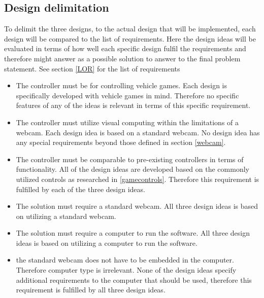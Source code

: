 \subsection{Design delimitation}

To delimit the three designs, to the actual design that will be implemented, each design will be compared to the list of requirements. Here the design ideas will be evaluated in terms of how well each specific design fulfil the requirements and therefore might answer as a possible solution to answer to the final problem statement. See section \ref{LOR} for the list of requirements

\begin{itemize}
\item The controller must be for controlling vehicle games.\newline
Each design is specifically developed with vehicle games in mind. Therefore no specific features of any of the ideas is relevant in terms of this specific requirement.

\item The controller must utilize visual computing within the limitations of a webcam.\newline
Each design idea is based on a standard webcam. No design idea has any special requirements beyond those defined in section \ref{webcam}. 

\item The controller must be comparable to pre-existing controllers in terms of functionality.\newline
All of the design ideas are developed based on the commonly utilized controls as researched in \ref{gamecontrols}. Therefore this requirement is fulfilled by each of the three design ideas.

\item The solution must require a standard webcam.\newline
All three design ideas is based on utilizing a standard webcam.

\item The solution must require a computer to run the software.\newline
All three design ideas is based on utilizing a computer to run the software.

\item the standard webcam does not have to be embedded in the computer. Therefore computer type is irrelevant.\newline
None of the design ideas specify additional requirements to the computer that should be used, therefore this requirement is fulfilled by all three design ideas.


\end{itemize}

